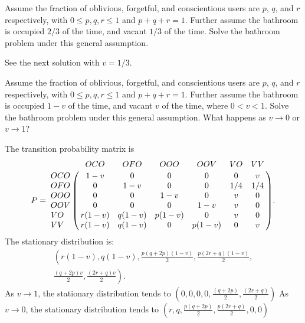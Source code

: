 \documentclass[12pt]{article}
\begin{document}
\begin{exercise}
    Assume the fraction of oblivious, forgetful, and conscientious users
    are \( p \), \( q \), and \( r \) respectively, with \( 0 \le p,q,r
    \le 1 \) and \( p + q + r = 1 \).  Further assume the bathroom is
    occupied \( 2/3 \) of the time, and vacant \( 1/3 \) of the time.
    Solve the bathroom problem under this general assumption.

\end{exercise}
\begin{solution}
    See the next solution with \( v = 1/3 \).
\end{solution}

\begin{exercise}
    Assume the fraction of oblivious, forgetful, and conscientious users
    are \( p \), \( q \), and \( r \) respectively, with \( 0 \le p,q,r
    \le 1 \) and \( p + q + r = 1 \).  Further assume the bathroom is
    occupied \( 1-v \) of the time, and vacant \( v \) of the time,
    where \( 0 < v < 1 \).  Solve the bathroom problem under this
    general assumption.  What happens as \( v \to 0 \) or \( v \to 1 \)?
\end{exercise}
\begin{solution}
    The transition probability matrix is
    \[
        P= \bordermatrix{ & OCO & OFO & OOO & OOV & VO & VV \cr
        OCO & 1-v & 0 & 0 & 0 & 0 & v \cr
        OFO & 0 & 1-v & 0 & 0 & 1/4 & 1/4 \cr
        OOO & 0 & 0 & 1-v & 0 & v & 0 \cr
        OOV & 0 & 0 & 0 & 1-v & v & 0 \cr
        VO & r(1-v) & q(1-v) & p(1-v) & 0 & v & 0 \cr
        VV & r(1-v) & q(1-v) & 0 & p(1-v) & 0 & v \cr
        }.
      \] The stationary distribution is:
      \begin{multline*}
        \left( r(1-v), q(1-v), \frac{p(q + 2p)(1-v)}{2}, \frac{p(2r + q)
            (1-v)}{2}, \right.\\
          \left. \frac{(q + 2p)v}{2}, \frac{(2r + q)v}{2} \right).
      \end{multline*}
    As \( v \to 1 \), the stationary distribution tends to \( \left(0,
    0, 0, 0, \frac{(q + 2p)}{2}, \frac{(2r + q)}{2} \right) \) As \( v
    \to 0 \), the stationary distribution tends to \( \left(r, q, \frac{p
    (q + 2p)}{2}, \frac{p(2r + q)}{2}, 0, 0 \right) \)
\end{solution}
\end{document}
